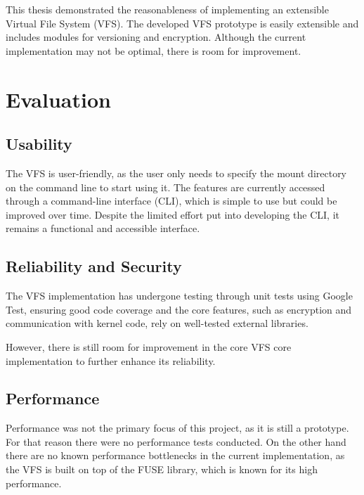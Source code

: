 
This thesis demonstrated the reasonableness of implementing an extensible Virtual File System (VFS).
The developed VFS prototype is easily extensible and includes modules for versioning and encryption.
Although the current implementation may not be optimal, there is room for improvement.

\section{Evaluation}\label{sec:evaluation}

\subsection{Usability}\label{subsec:usability}

The VFS is user-friendly, as the user only needs to specify the mount directory on the command line to start using it.
The features are currently accessed through a command-line interface (CLI), which is simple to use but could be improved over time.
Despite the limited effort put into developing the CLI, it remains a functional and accessible interface.

\subsection{Reliability and Security}\label{subsec:reliability-and-security}

The VFS implementation has undergone testing through unit tests using Google Test, ensuring good code coverage and the core features, such as encryption and communication with kernel code, rely on well-tested external libraries.

However, there is still room for improvement in the core VFS core implementation to further enhance its reliability.

\subsection{Performance}\label{subsec:performance}

Performance was not the primary focus of this project, as it is still a prototype.
For that reason there were no performance tests conducted.
On the other hand there are no known performance bottlenecks in the current implementation, as the VFS is built on top of the FUSE library, which is known for its high performance.


